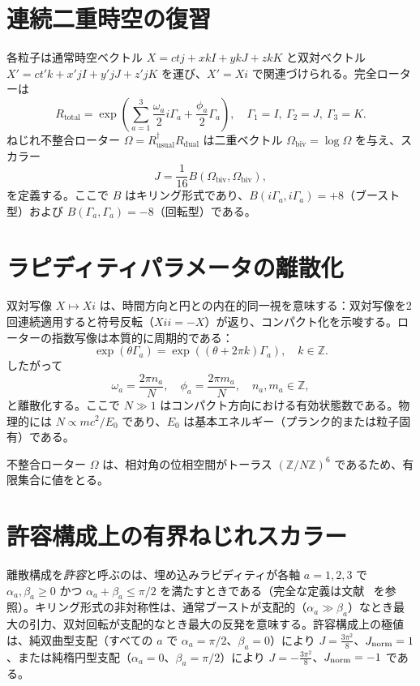 \documentclass[dvipdfmx,11pt,a4paper]{article}
\newcommand{\Jnorm}{J_{\rm norm}}
\newcommand{\Jbound}{\frac{3\pi^2}{8}}
\begin{document}
\section{連続二重時空の復習}
\label{sec:review}

各粒子は通常時空ベクトル $X = ct j + x kI + y kJ + z kK$ と双対ベクトル $X' = ct' k + x' jI + y' jJ + z' jK$ を運び、$X' = Xi$ で関連づけられる。完全ローターは
\[
R_\text{total} = \exp\left( \sum_{a=1}^3 \frac{\omega_a}{2} i\Gamma_a + \frac{\phi_a}{2} \Gamma_a \right), \quad \Gamma_1 = I,\ \Gamma_2 = J,\ \Gamma_3 = K.
\]
ねじれ不整合ローター $\Omega = R_\text{usual}^\dagger R_\text{dual}$ は二重ベクトル $\Omega_\text{biv} = \log \Omega$ を与え、スカラー
\[
J = \frac{1}{16} B(\Omega_\text{biv}, \Omega_\text{biv}),
\]
を定義する。ここで $B$ はキリング形式であり、$B(i\Gamma_a, i\Gamma_a) = +8$（ブースト型）および $B(\Gamma_a, \Gamma_a) = -8$（回転型）である。

\section{ラピディティパラメータの離散化}
\label{sec:discretization}

双対写像 $X \mapsto Xi$ は、時間方向と円との内在的同一視を意味する：双対写像を2回連続適用すると符号反転（$Xi i = -X$）が返り、コンパクト化を示唆する。ローターの指数写像は本質的に周期的である：
\[
\exp(\theta \Gamma_a) = \exp((\theta + 2\pi k) \Gamma_a), \quad k \in \mathbb{Z}.
\]
したがって
\[
\omega_a = \frac{2\pi n_a}{N}, \quad \phi_a = \frac{2\pi m_a}{N}, \quad n_a, m_a \in \mathbb{Z},
\]
と離散化する。ここで $N \gg 1$ はコンパクト方向における有効状態数である。物理的には $N \propto m c^2 / E_0$ であり、$E_0$ は基本エネルギー（プランク的または粒子固有）である。

不整合ローター $\Omega$ は、相対角の位相空間がトーラス $(\mathbb{Z}/N\mathbb{Z})^6$ であるため、有限集合に値をとる。

\section{許容構成上の有界ねじれスカラー}
\label{sec:bounded}

離散構成を\emph{許容}と呼ぶのは、埋め込みラピディティが各軸 $a=1,2,3$ で $\alpha_a,\beta_a\geq 0$ かつ $\alpha_a+\beta_a\leq\pi/2$ を満たすときである（完全な定義は文献~\cite{diophantine-paper} を参照）。キリング形式の非対称性は、通常ブーストが支配的（$\alpha_a \gg \beta_a$）なとき最大の引力、双対回転が支配的なとき最大の反発を意味する。許容構成上の極値は、純双曲型支配（すべての $a$ で $\alpha_a=\pi/2$、$\beta_a=0$）により $J=\Jbound$、$\Jnorm=1$、または純楕円型支配（$\alpha_a=0$、$\beta_a=\pi/2$）により $J=-\Jbound$、$\Jnorm=-1$ である。
\end{document}
